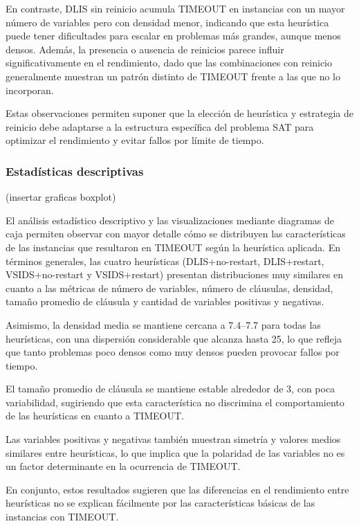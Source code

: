 En contraste, DLIS sin reinicio acumula TIMEOUT en instancias con un mayor número de variables pero con densidad menor, indicando que esta heurística puede tener dificultades para escalar en problemas más grandes, aunque menos densos. Además, la presencia o ausencia de reinicios parece influir significativamente en el rendimiento, dado que las combinaciones con reinicio generalmente muestran un patrón distinto de TIMEOUT frente a las que no lo incorporan. 

Estas observaciones permiten suponer que la elección de heurística y estrategia de reinicio debe adaptarse a la estructura específica del problema SAT para optimizar el rendimiento y evitar fallos por límite de tiempo.

\subsubsection{Estad\'isticas descriptivas}
(insertar graficas boxplot)

El análisis estadístico descriptivo y las visualizaciones mediante diagramas de caja permiten observar con mayor detalle cómo se distribuyen las características de las instancias que resultaron en TIMEOUT según la heurística aplicada. En términos generales, las cuatro heurísticas (DLIS+no-restart, DLIS+restart, VSIDS+no-restart y VSIDS+restart) presentan distribuciones muy similares en cuanto a las métricas de número de variables, número de cláusulas, densidad, tamaño promedio de cláusula y cantidad de variables positivas y negativas.

Asimismo, la densidad media se mantiene cercana a 7.4–7.7 para todas las heurísticas, con una dispersión considerable que alcanza hasta 25, lo que refleja que tanto problemas poco densos como muy densos pueden provocar fallos por tiempo.

El tamaño promedio de cláusula se mantiene estable alrededor de 3, con poca variabilidad, sugiriendo que esta característica no discrimina el comportamiento de las heurísticas en cuanto a TIMEOUT.

Las variables positivas y negativas también muestran simetría y valores medios similares entre heurísticas, lo que implica que la polaridad de las variables no es un factor determinante en la ocurrencia de TIMEOUT. 

En conjunto, estos resultados sugieren que las diferencias en el rendimiento entre heurísticas no se explican fácilmente por las características básicas de las instancias con TIMEOUT.

